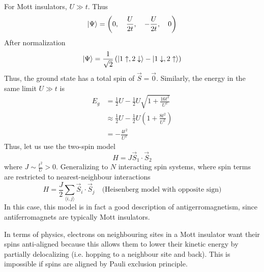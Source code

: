 \documentclass[12pt,a4paper,titlepage]{article}
\newcommand{\trm}[1]{\textrm{#1}} %
\newcommand{\up}{\uparrow} %
\newcommand{\dn}{\downarrow} %
\begin{document}
For Mott insulators, $U\gg t$. Thus
\begin{equation}
\ket{\Psi}=\left(0,\quad\frac{U}{2t},\quad-\frac{U}{2t},\quad 0\right)
\end{equation}
After normalization
\begin{equation}
\ket{\Psi}=\frac{1}{\sqrt{2}}\left(\ket{1\up,2\dn}-\ket{1\dn,2\up}\right)
\end{equation}
Thus, the ground state has a total spin of $\vec{S}=\vec{0}$. Similarly, the energy in the same limit $U\gg t$ is
\begin{equation}
\begin{aligned}
E_{g}&=\frac{1}{2}U-\frac{1}{2}U\sqrt{1+\frac{16t^{2}}{U^{2}}}\\
&\approx\frac{1}{2}U-\frac{1}{2}U\left(1+\frac{8t^{2}}{U^{2}}\right)\\
&=-\frac{4t^{2}}{U^{2}}
\end{aligned}
\end{equation}
Thus, let us use the two-spin model
\begin{equation}
H=J\vec{S}_{1}\cdot\vec{S}_{2}
\end{equation}
where $J\sim\frac{t^{2}}{U}>0$. Generalizing to $N$ interacting spin systems, where spin terms are restricted to nearest-neighbour interactions
\begin{equation}
H=\frac{J}{2}\sum_{\langle i,j\rangle}\vec{S}_{i}\cdot\vec{S}_{j}\quad\trm{(Heisenberg model with opposite sign)}
\end{equation}
In this case, this model is in fact a good description of antigerromagnetism, since antiferromagnets are typically Mott insulators.
\begin{center}
\end{center}
In terms of physics, electrons on neighbouring sites in a Mott insulator want their spins anti-aligned because this allows them to lower their kinetic energy by partially delocalizing (i.e. hopping to a neighbour site and back). This is impossible if spins are aligned by Pauli exclusion principle.\\
\end{document}

